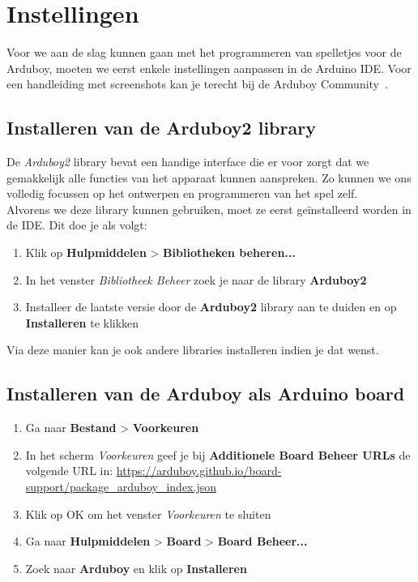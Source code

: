 \documentclass[11pt,fleqn]{book} %
\begin{document}
\section{Instellingen}

Voor we aan de slag kunnen gaan met het programmeren van spelletjes voor de Arduboy, moeten we eerst enkele instellingen aanpassen in de Arduino IDE. Voor een handleiding met screenshots kan je terecht bij de Arduboy Community~\cite{arduboy:tuto1}.

\subsection{Installeren van de Arduboy2 library}
De \emph{Arduboy2} library bevat een handige interface die er voor zorgt dat we gemakkelijk alle functies van het apparaat kunnen aanspreken. Zo kunnen we ons volledig focussen op het ontwerpen en programmeren van het spel zelf. \\

\noindent
Alvorens we deze library kunnen gebruiken, moet ze eerst geïnstalleerd worden in de IDE. Dit doe je als volgt:

\begin{enumerate}
	\item Klik op \textbf{Hulpmiddelen} > \textbf{Bibliotheken beheren...}
	\item In het venster \emph{Bibliotheek Beheer} zoek je naar de library \textbf{Arduboy2}
	\item Installeer de laatste versie door de \textbf{Arduboy2} library aan te duiden en op \textbf{Installeren} te klikken
\end{enumerate}
Via deze manier kan je ook andere libraries installeren indien je dat wenst.

\subsection{Installeren van de Arduboy als Arduino board}
\begin{enumerate}
	\item Ga naar \textbf{Bestand} > \textbf{Voorkeuren}
	\item In het scherm \emph{Voorkeuren} geef je bij \textbf{Additionele Board Beheer URLs} de volgende URL in: \url{https://arduboy.github.io/board-support/package_arduboy_index.json}
	\item Klik op OK om het venster \emph{Voorkeuren} te sluiten
	\item Ga naar \textbf{Hulpmiddelen} > \textbf{Board} > \textbf{Board Beheer...}
	\item Zoek naar \textbf{Arduboy} en klik op \textbf{Installeren}
\end{enumerate}
\end{document}
